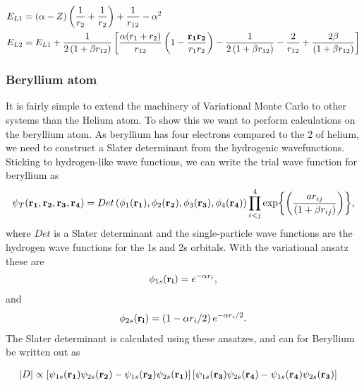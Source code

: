 		\begin{align}
			E_{L1} &= (\alpha - Z)\left( \frac{1}{r_2} + \frac{1}{r_2} \right) + \frac{1}{r_{12}} - \alpha ^2
			\\
			E_{L2} &= E_{L1} + \frac{1}{2\left(1+\beta r_{12}\right)} \left[ \frac{\alpha(r_1 + r_2)}{r_{12}}\left( 1 - \frac{\vb{r_1}\vb{r_2}}{r_1 r_2} \right)  -  \frac{1}{2\left(1+\beta r_{12}\right)} - \frac{2}{r_{12}} +  \frac{2\beta}{\left(1+\beta r_{12}\right)} \right]
		\end{align}


	\subsubsection{Beryllium atom}

		It is fairly simple to extend the machinery of Variational
		Monte Carlo to other systems than the Helium atom. To show this we
		want to perform calculations on the beryllium atom. As beryllium has
		four electrons compared to the 2 of helium, we need to construct a
		Slater determinant from the hydrogenic wavefunctions. Sticking to hydrogen-like wave functions,
		we can write the trial wave function for beryllium as
		\begin{equation}
			\psi_{T}({\bf r_{1}},{\bf r_{2}},{\bf r_{3}},{\bf r_{4}})=Det\left(\phi_{1}({\bf r_{1}}),\phi_{2}({\bf r_{2}}),\phi_{3}({\bf r_{3}}),\phi_{4}({\bf r_{4}})\right)\prod_{i<j}^{4}\exp{\left(\frac{a r_{ij}}{(1+\beta r_{ij})}\right)},
			\label{eq:BerylliumTrialFunction}
		\end{equation}
		where $Det$ is a Slater determinant and the single-particle wave
		functions are the hydrogen wave functions for the 1s and 2s orbitals.
		With the variational ansatz these are
		\begin{align}
			\phi_{1s}({\bf r_{i}})=e^{-\alpha r_{i}},
		\end{align}
		and
		\begin{align}
			\phi_{2s}({\bf r_{i}})=\left(1-\alpha r_{i}/2\right)e^{-\alpha r_{i}/2}.
		\end{align}
		The Slater determinant is calculated using these ansatzes, and can for Beryllium be written out as

		\begin{align}
			|D| &\propto 
			\left[ \psi_{1s}(\vb{r_1})\psi_{2s}(\vb{r_2}) -   \psi_{1s}(\vb{r_2})\psi_{2s}(\vb{r_1})  \right]
			\left[ \psi_{1s}(\vb{r_3})\psi_{2s}(\vb{r_4}) -   \psi_{1s}(\vb{r_4})\psi_{2s}(\vb{r_3})  
			\right]
		\end{align}

